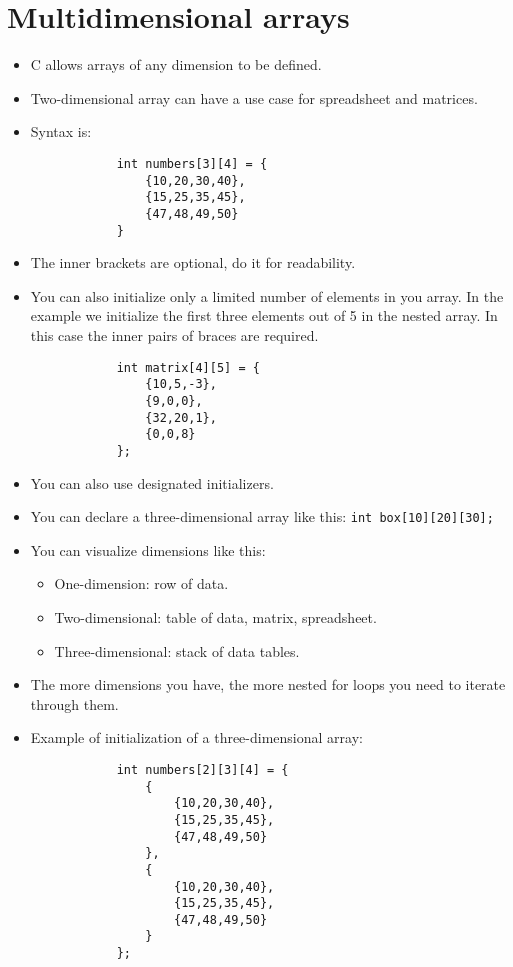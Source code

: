 \section{Multidimensional arrays}
\begin{itemize}
    \item C allows arrays of any dimension to be defined. 
    \item Two-dimensional array can have a use case for spreadsheet and matrices. 
    \item Syntax is:
        \begin{verbatim}
            int numbers[3][4] = { 
                {10,20,30,40},
                {15,25,35,45},
                {47,48,49,50}
            }
        \end{verbatim}
    
    \item The inner brackets are optional, do it for readability. 
    \item You can also initialize only a limited number of elements in you array. In the example we initialize the first three elements out of 5 in the nested array. In this case the inner pairs of braces are required. 
        \begin{verbatim}
            int matrix[4][5] = { 
                {10,5,-3},
                {9,0,0},
                {32,20,1},
                {0,0,8}
            }; 
        \end{verbatim}
    
    \item You can also use designated initializers.
    
    \item You can declare a three-dimensional array like this: \texttt{int box[10][20][30];}
    \item You can visualize dimensions like this: 
        \begin{itemize}
            \item One-dimension: row of data. 
            \item Two-dimensional: table of data, matrix, spreadsheet. 
            \item Three-dimensional: stack of data tables. 
        \end{itemize}
    
    \item The more dimensions you have, the more nested for loops you need to iterate through them.
    \item Example of initialization of a three-dimensional array: 
        \begin{verbatim}
            int numbers[2][3][4] = {
                {
                    {10,20,30,40},
                    {15,25,35,45},
                    {47,48,49,50}
                },
                {
                    {10,20,30,40},
                    {15,25,35,45},
                    {47,48,49,50}
                }
            }; 
        \end{verbatim}
    

\end{itemize}
